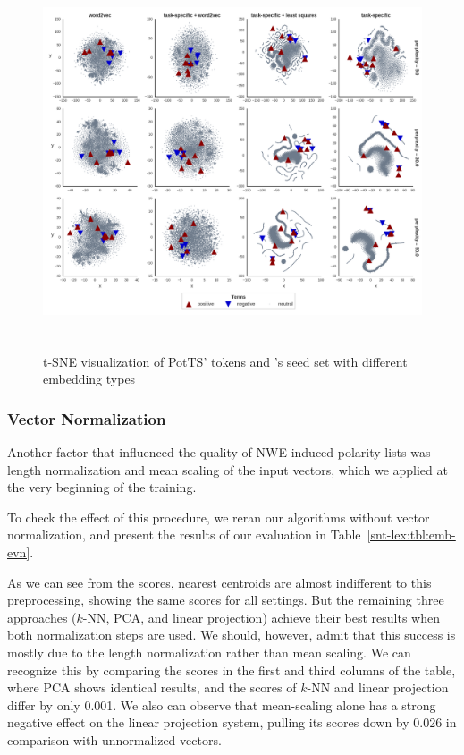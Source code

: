 \begin{figure}[bht]
  \centering
  \includegraphics[height=30em,width=\linewidth]{img/potts_embeddings.png}
  \caption[\citeauthor{Turney:03}'s seed
    set]{t-SNE visualization of PotTS' tokens and
    \citeauthor{Turney:03}'s seed set with different embedding
    types}\label{snt:fig:tsne-seeds}
\end{figure}

\subsubsection{Vector Normalization}\label{subsec:snt-lex:eowet}

Another factor that influenced the quality of NWE-induced polarity
lists was length normalization and mean scaling of the input vectors,
which we applied at the very beginning of the training.

To check the effect of this procedure, we reran our algorithms without
vector normalization, and present the results of our evaluation in
Table~\ref{snt-lex:tbl:emb-evn}.

As we can see from the scores, nearest centroids are almost
indifferent to this preprocessing, showing the same scores for all
settings.  But the remaining three approaches ($k$-NN, PCA, and linear
projection) achieve their best results when both normalization steps
are used.  We should, however, admit that this success is mostly due
to the length normalization rather than mean scaling.  We can
recognize this by comparing the scores in the first and third columns
of the table, where PCA shows identical results, and the scores of
$k$-NN and linear projection differ by only 0.001.  We also can
observe that mean-scaling alone has a strong negative effect on the
linear projection system, pulling its scores down by 0.026 in
comparison with unnormalized vectors.

